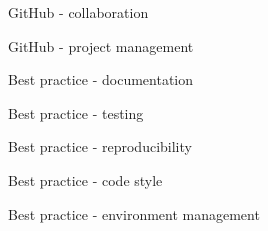 \documentclass{beamer} %
\begin{document}
  \begin{frame}{GitHub - collaboration}
  \end{frame}

  \begin{frame}{GitHub - project management}
  \end{frame}

  \begin{frame}{Best practice - documentation}
  \end{frame}

  \begin{frame}{Best practice - testing}
  \end{frame}

  \begin{frame}{Best practice - reproducibility}
  \end{frame}

  \begin{frame}{Best practice - code style}
  \end{frame}

  \begin{frame}{Best practice - environment management}
  \end{frame}
\end{document}

